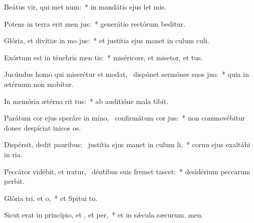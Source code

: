 \item Beátus vir, qui met num:~* in mandátis ejus let mis.
\item Potens in terra erit men jus:~* generátio rectórum beditur.
\item Glória, et divítiæ in mo jus:~* et justítia ejus manet in culum culi.
\item Exórtum est in ténebris men tis:~* miséricors, et misetor, et tus.
\item Jucúndus homo qui miserétur et modat,~\pscross{} dispónet sermónes suos  juo:~* quia in ætérnum non mobitur.
\item In memória ætérna rit tus:~* ab auditióne mala  tibit.
\item Parátum cor ejus speráre in mino,~\pscross{} confirmátum  cor jus:~* non commovébitur donec despíciat inicos os.
\item Dispérsit, dedit pauribus:~\pscross{} justítia ejus manet in culum li,~* cornu ejus exaltábi in ria.
\item Peccátor vidébit, et iratur,~\pscross{} déntibus suis fremet  tascet:~* desidérium peccarum perbit.
\item Glória tri, et o,~* et Spitui to.
\item Sicut erat in princípio, et , et per,~* et in sǽcula sæcurum. men.
